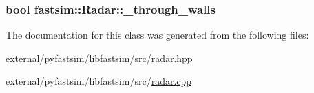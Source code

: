 \subsubsection[{\texorpdfstring{\+\_\+through\+\_\+walls}{_through_walls}}]{\setlength{\rightskip}{0pt plus 5cm}bool fastsim\+::\+Radar\+::\+\_\+through\+\_\+walls\hspace{0.3cm}{\ttfamily [protected]}}\hypertarget{classfastsim_1_1_radar_a6da26c33d2126d48fe77c06ba8f1de03}{}\label{classfastsim_1_1_radar_a6da26c33d2126d48fe77c06ba8f1de03}


The documentation for this class was generated from the following files\+:\begin{DoxyCompactItemize}
\item 
external/pyfastsim/libfastsim/src/\hyperlink{radar_8hpp}{radar.\+hpp}\item 
external/pyfastsim/libfastsim/src/\hyperlink{radar_8cpp}{radar.\+cpp}\end{DoxyCompactItemize}
